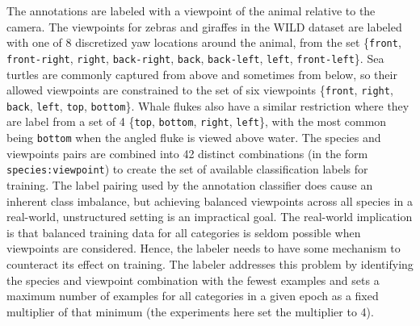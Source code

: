 The annotations are labeled with a viewpoint of the animal relative to the camera.  The viewpoints for zebras and giraffes in the WILD dataset are labeled with one of 8 discretized yaw locations around the animal, from the set \{\texttt{front}, \texttt{front-right}, \texttt{right}, \texttt{back-right}, \texttt{back}, \texttt{back-left}, \texttt{left}, \texttt{front-left}\}.  Sea turtles are commonly captured from above and sometimes from below, so their allowed viewpoints are constrained to the set of six viewpoints \{\texttt{front}, \texttt{right}, \texttt{back}, \texttt{left}, \texttt{top}, \texttt{bottom}\}.  Whale flukes also have a similar restriction where they are label from a set of 4 \{\texttt{top}, \texttt{bottom}, \texttt{right}, \texttt{left}\}, with the most common being \texttt{bottom} when the angled fluke is viewed above water.  The species and viewpoints pairs are combined into 42 distinct combinations (in the form \texttt{species:viewpoint}) to create the set of available classification labels for training.  The label pairing used by the annotation classifier does cause an inherent class imbalance, but achieving balanced viewpoints across all species in a real-world, unstructured setting is an impractical goal.  The real-world implication is that balanced training data for all categories is seldom possible when viewpoints are considered. Hence, the labeler needs to have some mechanism to counteract its effect on training.  The labeler addresses this problem by identifying the species and viewpoint combination with the fewest examples and sets a maximum number of examples for all categories in a given epoch as a fixed multiplier of that minimum (the experiments here set the multiplier to 4).

